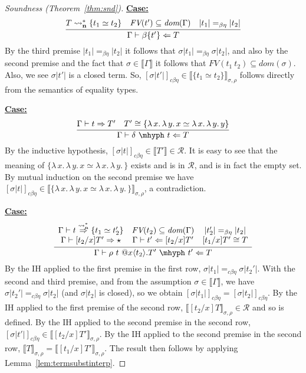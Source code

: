 \documentclass{article}
\newcommand{\absu}[3]{{#1}\, #2.\, #3}
\newcommand{\interp}[1]{\llbracket #1 \rrbracket}
\newcommand{\leadstocs}[0]{\ensuremath{\leadsto_{\mathbf{n}}^*}}
\newcommand{\tpcheck}[0]{\Leftarrow}
\newcommand{\tpsynth}[0]{\Rightarrow}
\newcommand{\tpsynthleads}[0]{\ensuremath{\overset{\leadstocs}{\Rightarrow}}}
\newcommand{\cbe}[0]{c\beta\eta}
\newcommand{\startcase}[1]{\vspace{#1} \noindent\textbf{\underline{Case:}}}
\begin{document}
\begin{proof}[Soundness (Theorem~\ref{thm:snd})]
\startcase{.2cm}
\[
  \infer{\Gamma\vdash \beta\{t'\} \tpcheck T}
  {T \leadstocs \{t_1 \simeq t_2\} \quad \textit{FV}(t')\subseteq \textit{dom}(\Gamma) \quad |t_1| =_{\beta\eta} |t_2|}
\]
By the third premise \(|t_1| =_{\beta\eta} |t_2|\) it follows that \(\sigma|t_1|
=_{\beta\eta} \sigma|t_2|\), and also by the second premise and the fact that
\(\sigma \in \interp{\Gamma}\) it follows that
\(\textit{FV}(t_1\ t_2) \subseteq \textit{dom}(\sigma)\).
Also, we see \(\sigma|t'|\) is a closed term.
So, $[\sigma|t'|]_{\cbe}\in\interp{\{ t_1 \simeq t_2 \}}_{\sigma,\rho}$ follows
directly from the semantics of equality types.

\startcase{.2cm}
\[
  \infer{\Gamma\vdash \delta\ \mhyph\ t \tpcheck T}
  {
    \Gamma \vdash t \tpsynth T'
    \quad T' \cong \{\absu{\lambda}{x}{\absu{\lambda}{y}{x}} \simeq \absu{\lambda}{x}{\absu{\lambda}{y}{y}}\}
  }
\]
By the inductive hypothesis, \([\sigma|t|]_{\cbe} \in \interp{T'} \in
\mathcal{R}\).
It is easy to see that the meaning of \(\{\absu{\lambda}{x}{\absu{\lambda}{y}{x}
\simeq \absu{\lambda}{x}{\absu{\lambda}{y}}}\}\) exists and is in
\(\mathcal{R}\), and is in fact the empty set.
By mutual induction on the second premise we have \([\sigma|t|]_{\cbe} \in
\interp{\{\absu{\lambda}{x}{\absu{\lambda}{y}{x} \simeq
    \absu{\lambda}{x}{\absu{\lambda}{y}}}\}}_{\sigma,\rho}\), a contradiction.

\startcase{.2cm}
\[
  \infer{\Gamma \vdash \rho\ t\ @x\langle t_2 \rangle.T'\ \mhyph\ t' \tpcheck T}
  {
    \begin{array}{ccc}
      \Gamma \vdash t \tpsynthleads \{t_1 \simeq t_2'\}
      & \textit{FV}(t_2) \subseteq \textit{dom}(\Gamma)
      & |t_2'| =_{\beta\eta} |t_2|
      \\ \Gamma \vdash [t_2/x] T' \tpsynth \star
      & \Gamma \vdash t' \tpcheck [t_2/x]T'
      & [t_1/x]T' \cong T
    \end{array}
  }
\]
By the IH applied to the first premise in the first row, $\sigma|t_1| =_{\cbe}
\sigma|t_2'|$.
With the second and third premise, and from the assumption \(\sigma \in
\interp{\Gamma}\), we have \(\sigma|t_2'| =_{\cbe} \sigma|t_2|\) (and
\(\sigma|t_2|\) is closed), so we obtain
\([\sigma|t_1|]_{\cbe} = [\sigma|t_2|]_{\cbe}\).
By the IH applied to the first premise of the second row,
\(\interp{[t_2/x]T}_{\sigma,\rho} \in \mathcal{R}\) and so is defined.
By the IH applied to the second premise in the second row,
\([\sigma|t'|]_{c\beta\eta} \in \interp{[t_2/x]T'}_{\sigma,\rho}\).
By the IH applied to the second premise in the second row,
\(\interp{T}_{\sigma,\rho} = \interp{[t_1/x]T'}_{\sigma,\rho}\).
The result then follows by applying Lemma~\ref{lem:termsubstinterp}.


\end{proof}
\end{document}
